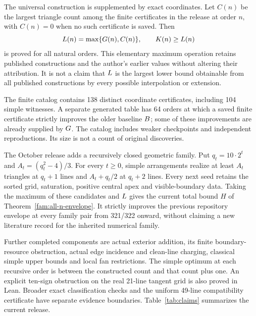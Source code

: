The universal construction is supplemented by exact coordinates. Let $C(n)$ be the largest triangle count among the finite certificates in the release at order $n$, with $C(n)=0$ when no such certificate is saved. Then
\begin{equation}\label{eq:envelope}
L(n)=\max\{G(n),C(n)\},\qquad K(n)\ge L(n)
\end{equation}
is proved for all natural orders. This elementary maximum operation retains published constructions and the author's earlier values without altering their attribution. It is not a claim that $L$ is the largest lower bound obtainable from all published constructions by every possible interpolation or extension.

The finite catalog contains 138 distinct coordinate certificates, including 104 simple witnesses. A separate generated table has 64 orders at which a saved finite certificate strictly improves the older baseline $B$; some of these improvements are already supplied by $G$. The catalog includes weaker checkpoints and independent reproductions. Its size is not a count of original discoveries.

The October release adds a recursively closed geometric family. Put
$q_t=10\cdot2^t$ and $A_t=(q_t^2-4)/3$. For every $t\ge0$, simple
arrangements realize at least $A_t$ triangles at $q_t+1$ lines and
$A_t+q_t/2$ at $q_t+2$ lines. Every next seed retains the sorted grid,
saturation, positive central apex and visible-boundary data. Taking
the maximum of these candidates and $L$ gives the current total
bound $H$ of Theorem~\ref{fam:all-n-envelope}. It strictly improves
the previous repository envelope at every family pair from 321/322
onward, without claiming a new literature record for the inherited
numerical family.

Further completed components are actual exterior addition, its finite
boundary-resource obstruction, actual edge incidence and clean-line
charging, classical simple upper bounds and local fan restrictions.
The simple optimum at each recursive order is between the constructed
count and that count plus one. An explicit ten-sign obstruction on
the real 21-line tangent grid is also proved in Lean. Broader exact
classification checks and the uniform 49-line compatibility certificate
have separate evidence boundaries. Table~\ref{tab:claims} summarizes
the current release.

